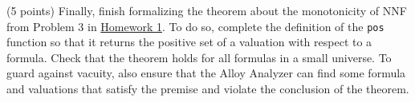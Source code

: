 \documentclass{handout}
\begin{document}
\begin{questions}
\item (5 points) \label{prob:alloy:last} Finally, finish formalizing the theorem
about the monotonicity of NNF from Problem 3 in
\href{\website/doc/hw1.pdf}{Homework 1}. To do so, complete the definition of
the \texttt{pos} function so that it returns the positive  set of a valuation
with respect to a formula. Check that the theorem holds for all formulas in a
small universe. To guard against vacuity, also ensure that the Alloy Analyzer
can find some formula and valuations that satisfy the premise and violate the
conclusion of the theorem.

\end{questions}
\end{document}
